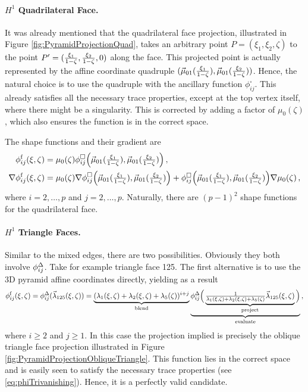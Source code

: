\paragraph{\texorpdfstring{$H^1$}{H1} Quadrilateral Face.} 
It was already mentioned that the quadrilateral face projection, illustrated in Figure \ref{fig:PyramidProjectionQuad}, takes an arbitrary point $P=(\xi_1,\xi_2,\zeta)$ to the point $P'=(\textstyle{\frac{\xi_1}{1-\zeta}},\textstyle{\frac{\xi_2}{1-\zeta}},0)$ along the face. This projected point is actually represented by the affine coordinate quadruple $(\vec{\mu}_{01}(\textstyle{\frac{\xi_1}{1-\zeta}}),\vec{\mu}_{01}(\textstyle{\frac{\xi_2}{1-\zeta}}))$. 
Hence, the natural choice is to use the quadruple with the ancillary function $\phi_{ij}^\square$. 
This already satisfies all the necessary trace properties, except at the top vertex itself, where there might be a singularity.
This is corrected by adding a factor of $\mu_0(\zeta)$, which also ensures the function is in the correct space.

The shape functions and their gradient are
\begin{equation}
	\begin{aligned}
		\phi_{ij}^\mathrm{f}(\xi,\zeta)&=\mu_0(\zeta)\phi_{ij}^\square\Big(\vec{\mu}_{01}(\textstyle{\frac{\xi_1}{1-\zeta}}),\vec{\mu}_{01}(\textstyle{\frac{\xi_2}{1-\zeta}})\Big)\,,\\
    	\nabla\phi_{ij}^\mathrm{f}(\xi,\zeta)&=\mu_0(\zeta)\nabla\phi_{ij}^\square\Big(\vec{\mu}_{01}(\textstyle{\frac{\xi_1}{1-\zeta}}),\vec{\mu}_{01}(\textstyle{\frac{\xi_2}{1-\zeta}})\Big)
        +\phi_{ij}^\square\Big(\vec{\mu}_{01}(\textstyle{\frac{\xi_1}{1-\zeta}}),\vec{\mu}_{01}(\textstyle{\frac{\xi_2}{1-\zeta}})\Big)\nabla\mu_0(\zeta)\,,	
	\end{aligned}
	\label{eq:PyrH1QuadFace}
\end{equation}
where $i=2,\ldots,p$ and $j=2,\ldots,p$. 
Naturally, there are $(p-1)^2$ shape functions for the quadrilateral face.

\paragraph{\texorpdfstring{$H^1$}{H1} Triangle Faces.} 
Similar to the mixed edges, there are two possibilities.
Obviously they both involve $\phi_{ij}^\Delta$.
Take for example triangle face 125.
The first alternative is to use the 3D pyramid affine coordinates directly, yielding as a result
\begin{equation*}
	\phi_{ij}^\mathrm{f}(\xi,\zeta)=\phi_{ij}^\Delta(\vec{\lambda}_{125}(\xi,\zeta))=
		\underbrace{(\lambda_1(\xi,\zeta)+\lambda_2(\xi,\zeta)+\lambda_5(\zeta))^{i+j}}_{\text{blend}}
    	\underbrace{\phi_{ij}^\Delta\Big(\underbrace{\textstyle{\frac{1}{\lambda_1(\xi,\zeta)+\lambda_2(\xi,\zeta)+\lambda_5(\zeta)}}
    		\vec{\lambda}_{125}(\xi,\zeta)}_{\text{project}}\Big)}_{\text{evaluate}}\,,
\end{equation*}
where $i\geq2$ and $j\geq1$.
In this case the projection implied is precisely the oblique triangle face projection illustrated in Figure \ref{fig:PyramidProjectionObliqueTriangle}.
This function lies in the correct space and is easily seen to satisfy the necessary trace properties (see \eqref{eq:phiTrivanishing}).
Hence, it is a perfectly valid candidate.

